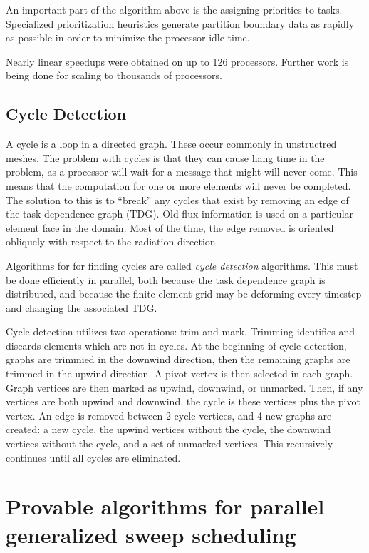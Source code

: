 \documentclass[11pt, letterpaper,titlepage,oneside]{article}
\begin{document}
An important part of the algorithm above is the assigning priorities to tasks. Specialized prioritization heuristics generate partition boundary data as rapidly as possible in order to minimize the processor idle time. 

Nearly linear speedups were obtained on up to 126 processors. Further work is being done for scaling to thousands of processors. 

\subsection*{Cycle Detection}

A cycle is a loop in a directed graph. These occur commonly in unstructred meshes. The problem with cycles is that they can cause hang time in the problem, as a processor will wait for a message that might will never come. This means that the computation for one or more elements will never be completed. The solution to this is to ``break'' any cycles that exist by removing an edge of the task dependence graph (TDG). Old flux information is used on a particular element face in the domain. Most of the time, the edge removed is oriented obliquely with respect to the radiation direction. 

Algorithms for for finding cycles are called \textit{cycle detection} algorithms. This must be done efficiently in parallel, both because the task dependence graph is distributed, and because the finite element grid may be deforming every timestep and changing the associated TDG.

Cycle detection utilizes two operations: trim and mark. Trimming identifies and discards elements which are not in cycles. At the beginning of cycle detection, graphs are trimmied in the downwind direction, then the remaining graphs are trimmed in the upwind direction. A pivot vertex is then selected in each graph. Graph vertices are then marked as upwind, downwind, or unmarked. Then, if any vertices are both upwind and downwind, the cycle is these vertices plus the pivot vertex. An edge is removed between 2 cycle vertices, and 4 new graphs are created: a new cycle, the upwind vertices without the cycle, the downwind vertices without the cycle, and a set of unmarked vertices. This recursively continues until all cycles are eliminated.

\section*{Provable algorithms for parallel generalized sweep scheduling}
\end{document}
